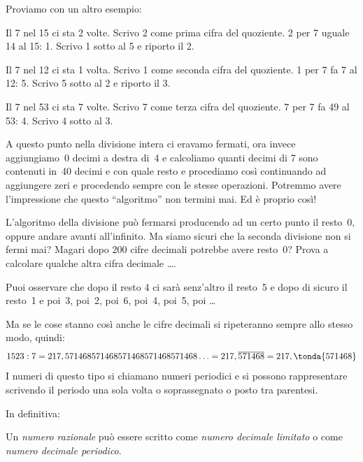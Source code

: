 
Proviamo con un altro esempio:

\begin{minipage}[]{.39\textwidth}
Il 7 nel 15 ci sta 2 volte. Scrivo 2 come prima cifra del quoziente.
2 per 7 uguale 14 al 15: 1. Scrivo 1 sotto al 5 e riporto il 2.

Il 7 nel 12 ci sta 1 volta. Scrivo 1 come seconda cifra del quoziente.
1 per 7 fa 7 al 12: 5. Scrivo 5 sotto al 2 e riporto il 3.

Il 7 nel 53 ci sta 7 volte. Scrivo 7 come terza cifra del quoziente.
7 per 7 fa 49 al 53: 4. Scrivo 4 sotto al 3.

\end{minipage}
\begin{minipage}[]{.59\textwidth}
\begin{center}\end{center}
\end{minipage}

A questo punto nella divisione intera ci eravamo fermati, ora invece 
aggiungiamo~0 decimi a destra di~4 e calcoliamo quanti decimi di 7 sono 
contenuti in~40 decimi e con quale resto e procediamo così continuando ad 
aggiungere zeri e procedendo sempre con le stesse operazioni.
Potremmo avere l'impressione che questo ``algoritmo'' non termini mai. 
Ed è proprio così!

L'algoritmo della divisione può fermarsi producendo ad un certo punto il 
resto~0, oppure andare avanti all'infinito. Ma siamo sicuri che la seconda 
divisione non si fermi mai? Magari dopo 200 cifre decimali potrebbe avere 
resto~0? Prova a calcolare qualche altra cifra decimale \dots.

Puoi osservare che dopo il resto 4 ci sarà senz'altro il resto~5 e dopo di 
sicuro il resto~1 e poi~3, poi~2, poi~6, poi~4, poi~5, poi \dots

Ma se le cose stanno così anche le cifre decimali si ripeteranno sempre 
allo stesso modo, quindi:
\[1523 : 7 = 217,571468571468571468571468571468\ldots = 
217,\overline{571468} = 217,\tonda{571468}\]
I numeri di questo tipo si chiamano numeri periodici e si possono 
rappresentare scrivendo il periodo una sola volta o soprassegnato o posto 
tra parentesi.

In definitiva:

\begin{definizione}
 Un \emph{numero razionale} può essere scritto come \emph{numero decimale 
limitato} o come \emph{numero decimale periodico}.
\end{definizione}

